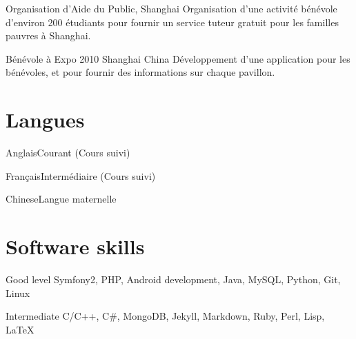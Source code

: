 \documentclass{tccv}
\begin{document}
\begin{factlist}
\item{Organisation d’Aide du Public, Shanghai}
{Organisation d’une activité bénévole d’environ 200 étudiants pour fournir un service tuteur gratuit pour les familles pauvres à Shanghai.}
\item{Bénévole à Expo 2010 Shanghai China}
{Développement d’une application pour les bénévoles, et pour fournir des informations sur chaque pavillon.}
\end{factlist}

\section{Langues}

\begin{factlist}
\item{Anglais}{Courant (Cours suivi)}
\item{Français}{Intermédiaire (Cours suivi)}
\item{Chinese}{Langue maternelle}
\end{factlist}

\section{Software skills}

\begin{factlist}

\item{Good level}
     {Symfony2, PHP, Android development, Java, MySQL, Python, Git, Linux}

\item{Intermediate}
     {C/C++, C\#, MongoDB, Jekyll, Markdown, Ruby, Perl, Lisp, LaTeX}

\end{factlist}
\end{document}
